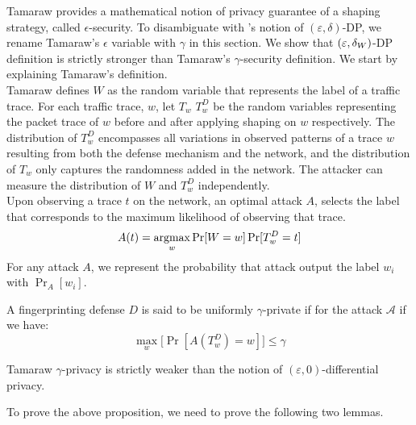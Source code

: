 Tamaraw \cite{cai2014tamaraw} provides a
mathematical notion of privacy guarantee of a shaping strategy, called $\epsilon$-security.
To disambiguate with {\sys}'s notion of $(\varepsilon, \delta)$-DP, we rename Tamaraw's $\epsilon$ variable with $\gamma$ in this section.
We show that $(\varepsilon, \delta_{W})$-DP definition is strictly stronger than Tamaraw's $\gamma$-security definition.
We start by explaining Tamaraw's definition.
\\
\noindent
Tamaraw defines $W$ as the random variable that represents the label of a
traffic trace.
For each traffic trace, $w$, let $T_{w}$ $T_{w}^{D}$ be the random variables representing
the packet trace of $w$ before and after applying shaping on $w$ respectively.
The distribution of $T_{w}^D$ encompasses all variations in observed
patterns of a trace $w$ resulting from both the defense mechanism and the
network, and the distribution of $T_{w}$ only captures the randomness added in the network.
The attacker can measure the distribution of $W$ and $T_{w}^{D}$ independently.
\\
\noindent
Upon observing a trace $t$ on the network, an optimal attack $A$, selects the
label that corresponds to the maximum likelihood of observing that trace.
\begin{equation*}
  A(t) = \operatorname*{argmax}_{w}{\Pr[W=w]\Pr[T_{w}^{D}=t]}
\end{equation*}
For any attack $A$, we represent the probability that attack output the label $w_i$ with $\Pr_A[w_i]$.
\begin{definition}
  A fingerprinting defense $D$ is said to be uniformly $\gamma$-private if for the attack $\mathcal{A}$ if we have:
  \begin{equation*}
    \max_w\big[\Pr[A(T_w^D)=w]\big] \leq \gamma
  \end{equation*}
\end{definition}

\begin{proposition}
  Tamaraw $\gamma$-privacy is strictly weaker than the notion of $(\varepsilon, 0)$-differential privacy.
\end{proposition}
\noindent
To prove the above proposition, we need to prove the following two lemmas.


